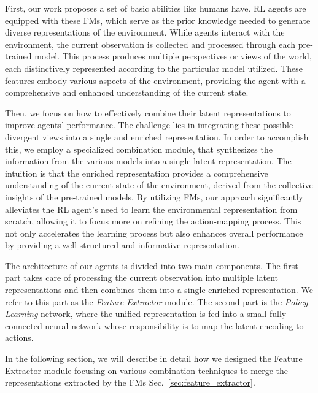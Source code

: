 First, our work proposes a set of basic abilities like humans have.
RL agents are equipped with these FMs, which serve as the prior knowledge needed to generate diverse representations of the environment.
While agents interact with the environment, the current observation is collected and processed through each pre-trained model.
This process produces multiple perspectives or views of the world, each distinctively represented according to the particular model utilized.
These features embody various aspects of the environment, providing the agent with a comprehensive and enhanced understanding of the current state.

Then, we focus on how to effectively combine their latent representations to improve agents' performance.
The challenge lies in integrating these possible divergent views into a single and enriched representation.
In order to accomplish this, we employ a specialized combination module, that synthesizes the information from the various models into a single latent representation.
The intuition is that the enriched representation provides a comprehensive understanding of the current state of the environment, derived from the collective insights of the pre-trained models.
By utilizing FMs, our approach significantly alleviates the RL agent's need to learn the environmental representation from scratch, allowing it to focus more on refining the action-mapping process.
This not only accelerates the learning process but also enhances overall performance by providing a well-structured and informative representation.

The architecture of our agents is divided into two main components.
The first part takes care of processing the current observation into multiple latent representations and then combines them into a single enriched representation.
We refer to this part as the \textit{Feature Extractor} module.
The second part is the \textit{Policy Learning} network, where the unified representation is fed into a small fully-connected neural network whose responsibility is to map the latent encoding to actions.


In the following section, we will describe in detail how we designed the Feature Extractor module focusing on various combination techniques to merge the representations extracted by the FMs Sec.~\ref{sec:feature_extractor}.



